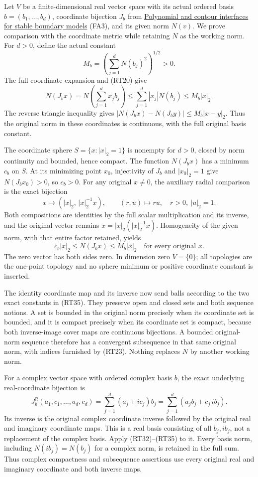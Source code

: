 \documentclass[
  11pt,
]{article}
\begin{document}
Let \(V\) be a finite-dimensional real vector space with its actual
ordered basis \(b=(b_1,\ldots,b_d)\), coordinate bijection \(J_b\) from
\href{stable-prerequisite-bridges.pdf}{Polynomial and contour interfaces
for stable boundary models} (FA3), and its given norm \(N(v)\). We prove
comparison with the coordinate metric while retaining \(N\) as the
working norm. For \(d>0\), define the actual constant \[
M_b=\left(\sum_{j=1}^d N(b_j)^2\right)^{1/2}>0.
\tag{RT32}
\] The full coordinate expansion and (RT20) give \[
N(J_bx)=N\left(\sum_{j=1}^d x_jb_j\right)
\le\sum_{j=1}^d |x_j|N(b_j)\le M_b|x|_2.
\tag{RT33}
\] The reverse triangle inequality gives
\(|N(J_bx)-N(J_by)|\le M_b|x-y|_2\). Thus the original norm in these
coordinates is continuous, with the full original basis constant.

The coordinate sphere \(S=\{x:|x|_2=1\}\) is nonempty for \(d>0\),
closed by norm continuity and bounded, hence compact. The function
\(N(J_bx)\) has a minimum \(c_b\) on \(S\). At its minimizing point
\(x_0\), injectivity of \(J_b\) and \(|x_0|_2=1\) give \(N(J_bx_0)>0\),
so \(c_b>0\). For any original \(x\ne0\), the auxiliary radial
comparison is the exact bijection \[
x\longmapsto(|x|_2,\,|x|_2^{-1}x),\qquad
(r,u)\longmapsto ru,\quad r>0,\ |u|_2=1.
\tag{RT34}
\] Both compositions are identities by the full scalar multiplication
and its inverse, and the original vector remains
\(x=|x|_2(|x|_2^{-1}x)\). Homogeneity of the given norm, with that
entire factor retained, yields \[
c_b|x|_2\le N(J_bx)\le M_b|x|_2
\quad\text{for every original }x.
\tag{RT35}
\] The zero vector has both sides zero. In dimension zero \(V=\{0\}\);
all topologies are the one-point topology and no sphere minimum or
positive coordinate constant is inserted.

The identity coordinate map and its inverse now send balls according to
the two exact constants in (RT35). They preserve open and closed sets
and both sequence notions. A set is bounded in the original norm
precisely when its coordinate set is bounded, and it is compact
precisely when its coordinate set is compact, because both inverse-image
cover maps are continuous bijections. A bounded original-norm sequence
therefore has a convergent subsequence in that same original norm, with
indices furnished by (RT23). Nothing replaces \(N\) by another working
norm.

For a complex vector space with ordered complex basis \(b\), the exact
underlying real-coordinate bijection is \[
J_b^{\mathbb R}(a_1,c_1,\ldots,a_d,c_d)
=\sum_{j=1}^d(a_j+ic_j)b_j
=\sum_{j=1}^d(a_jb_j+c_j\,ib_j).
\tag{RT36}
\] Its inverse is the original complex coordinate inverse followed by
the original real and imaginary coordinate maps. This is a real basis
consisting of all \(b_j,ib_j\), not a replacement of the complex basis.
Apply (RT32)--(RT35) to it. Every basis norm, including
\(N(ib_j)=N(b_j)\) for a complex norm, is retained in the full sum. Thus
complex compactness and subsequence assertions use every original real
and imaginary coordinate and both inverse maps.
\end{document}
